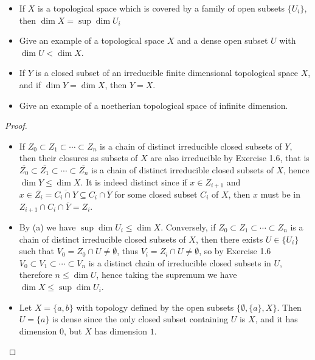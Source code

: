 \documentclass[a4paper]{article}
\begin{document}
\begin{enumerate} [label=\textbf{\arabic*.}, leftmargin=0em]
\begin{itemize}
              \item[(b)] If $X$ is a topological space which is covered by a family of open subsets $\{ U_i \}$, then $\dim{X} = \sup{\dim{U_i}}$

              \item[(c)] Give an example of a topological space $X$ and a dense open subset $U$ with $\dim{U} < \dim{X}$.

              \item[(d)] If $Y$ is a closed subset of an irreducible finite dimensional topological space $X$, and if $\dim{Y} = \dim{X}$, then $Y = X$.

              \item[(e)] Give an example of a noetherian topological space of infinite dimension.
          \end{itemize}

          \begin{proof} $ $ \vspace{0pt}
              \begin{itemize} [leftmargin=0cm]
                  \item[(a)] If $Z_0 \subset Z_1 \subset \cdots \subset Z_n$ is a chain of distinct irreducible closed subsets of $Y$, then their closures as subsets of $X$ are also irreducible by Exercise 1.6, that is $\overline{Z_0} \subset \overline{Z_1} \subset \cdots \subset \overline{Z_n}$ is a chain of distinct irreducible closed subsets of $X$, hence $\dim{Y} \leq \dim{X}$. It is indeed distinct since if $x \in Z_{i + 1}$ and $x \in \overline{Z_i} = \overline{C_i \cap Y} \subseteq C_i \cap \overline{Y}$ for some closed subset $C_i$ of $X$, then $x$ must be in $Z_{i + 1} \cap C_i \cap \overline{Y} = Z_i$.

                  \item[(b)] By (a) we have $\sup{\dim{U_i}} \leq \dim{X}$. Conversely, if $Z_0 \subset Z_1 \subset \cdots \subset Z_n$ is a chain of distinct irreducible closed subsets of $X$, then there exists $U \in \{U_i\}$ such that $V_0 = Z_0 \cap U \neq \emptyset$, thus $V_i = Z_i \cap U \neq \emptyset$, so by Exercise 1.6 $V_0 \subset V_1 \subset \cdots \subset V_n$ is a distinct chain of irreducible closed subsets in $U$, therefore $n \leq \dim{U}$, hence taking the supremum we have $\dim{X} \leq \sup{\dim{U_i}}$.

                  \item[(c)] Let $X = \{ a, b \}$ with topology defined by the open subsets $\{ \emptyset, \{a \}, X \}$. Then $U = \{a \}$ is dense since the only closed subset containing $U$ is $X$, and it has dimension $0$, but $X$ has dimension $1$.


\end{itemize}
\end{proof}
\end{enumerate}
\end{document}
